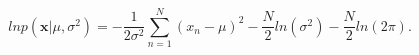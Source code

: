 \begin{equation}
\label{eq:loglikelihoodgaussian}
ln p(\mathbf{x} | \mu, \sigma^2) = - \frac{1}{2 \sigma^2} \sum_{n = 1}^{N}{(x_n
- \mu)^2} - \frac{N}{2} ln (\sigma^2) - \frac{N}{2} ln (2 \pi) .
\end{equation}